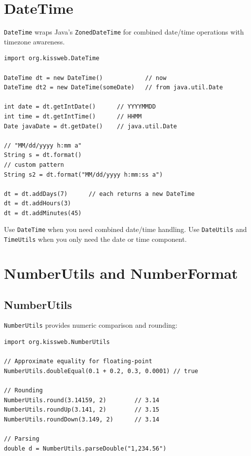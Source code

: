 \section{DateTime}
\label{sec:util-datetime}

\texttt{DateTime} wraps Java's \texttt{ZonedDateTime} for combined date/time operations with timezone awareness.

\begin{lstlisting}[style=groovy]
import org.kissweb.DateTime

DateTime dt = new DateTime()            // now
DateTime dt2 = new DateTime(someDate)   // from java.util.Date

int date = dt.getIntDate()      // YYYYMMDD
int time = dt.getIntTime()      // HHMM
Date javaDate = dt.getDate()    // java.util.Date

// "MM/dd/yyyy h:mm a"
String s = dt.format()
// custom pattern
String s2 = dt.format("MM/dd/yyyy h:mm:ss a")

dt = dt.addDays(7)      // each returns a new DateTime
dt = dt.addHours(3)
dt = dt.addMinutes(45)
\end{lstlisting}

\begin{notebox}
Use \texttt{DateTime} when you need combined date/time handling.  Use \texttt{DateUtils} and \texttt{TimeUtils} when you only need the date or time component.
\end{notebox}

\section{NumberUtils and NumberFormat}
\label{sec:util-number}

\subsection{NumberUtils}

\texttt{NumberUtils} provides numeric comparison and rounding:

\begin{lstlisting}[style=groovy]
import org.kissweb.NumberUtils

// Approximate equality for floating-point
NumberUtils.doubleEqual(0.1 + 0.2, 0.3, 0.0001) // true

// Rounding
NumberUtils.round(3.14159, 2)        // 3.14
NumberUtils.roundUp(3.141, 2)        // 3.15
NumberUtils.roundDown(3.149, 2)      // 3.14

// Parsing
double d = NumberUtils.parseDouble("1,234.56")
\end{lstlisting}

